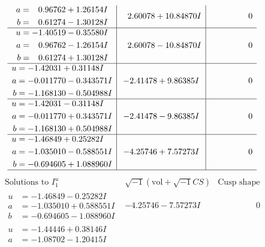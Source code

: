\documentclass[1p]{elsarticle_modified}
\theoremstyle{definition}
\newcommand{\I}{\sqrt{-1}}
\begin{document}
$$\begin{array}{c|c|c}
\begin{aligned}
a &= \phantom{-}0.96762 + 1.26154 I \\
b &= \phantom{-}0.61274 - 1.30128 I\end{aligned}
 & \phantom{-}2.60078 + 10.84870 I & \phantom{-0.000000 } 0 \\ \hline\begin{aligned}
u &= -1.40519 - 0.35580 I \\
a &= \phantom{-}0.96762 - 1.26154 I \\
b &= \phantom{-}0.61274 + 1.30128 I\end{aligned}
 & \phantom{-}2.60078 - 10.84870 I & \phantom{-0.000000 } 0 \\ \hline\begin{aligned}
u &= -1.42031 + 0.31148 I \\
a &= -0.011770 - 0.343571 I \\
b &= -1.168130 - 0.504988 I\end{aligned}
 & -2.41478 + 9.86385 I & \phantom{-0.000000 } 0 \\ \hline\begin{aligned}
u &= -1.42031 - 0.31148 I \\
a &= -0.011770 + 0.343571 I \\
b &= -1.168130 + 0.504988 I\end{aligned}
 & -2.41478 - 9.86385 I & \phantom{-0.000000 } 0 \\ \hline\begin{aligned}
u &= -1.46849 + 0.25282 I \\
a &= -1.035010 - 0.588551 I \\
b &= -0.694605 + 1.088960 I\end{aligned}
 & -4.25746 + 7.57273 I & \phantom{-0.000000 } 0\\
 \hline 
 \end{array}$$\newpage$$\begin{array}{c|c|c}  
\text{Solutions to }I^u_{1}& \I (\text{vol} + \sqrt{-1}CS) & \text{Cusp shape}\\
 \hline 
\begin{aligned}
u &= -1.46849 - 0.25282 I \\
a &= -1.035010 + 0.588551 I \\
b &= -0.694605 - 1.088960 I\end{aligned}
 & -4.25746 - 7.57273 I & \phantom{-0.000000 } 0 \\ \hline\begin{aligned}
u &= -1.44446 + 0.38146 I \\
a &= -1.08702 - 1.20415 I \\

\end{aligned}
\end{array}$$
\end{document}

